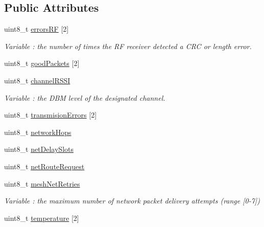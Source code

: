 \subsection*{Public Attributes}
\begin{DoxyCompactItemize}
\item 
uint8\+\_\+t \hyperlink{class_wasp_x_bee900_afb2d912f453a295b9c049b29cd319001}{errors\+RF} \mbox{[}2\mbox{]}\hypertarget{class_wasp_x_bee900_afb2d912f453a295b9c049b29cd319001}{}\label{class_wasp_x_bee900_afb2d912f453a295b9c049b29cd319001}

\begin{DoxyCompactList}\small\item\em Variable \+: the number of times the RF receiver detected a C\+RC or length error. \end{DoxyCompactList}\item 
uint8\+\_\+t \hyperlink{class_wasp_x_bee900_a843814bd98074108a8107088bbcdf231}{good\+Packets} \mbox{[}2\mbox{]}
\item 
uint8\+\_\+t \hyperlink{class_wasp_x_bee900_a38da243d21150ecfec318d85cc4cdd2b}{channel\+R\+S\+SI}\hypertarget{class_wasp_x_bee900_a38da243d21150ecfec318d85cc4cdd2b}{}\label{class_wasp_x_bee900_a38da243d21150ecfec318d85cc4cdd2b}

\begin{DoxyCompactList}\small\item\em Variable \+: the D\+BM level of the designated channel. \end{DoxyCompactList}\item 
uint8\+\_\+t \hyperlink{class_wasp_x_bee900_a5cc97a8a578c273096972e65229012ec}{transmision\+Errors} \mbox{[}2\mbox{]}
\item 
uint8\+\_\+t \hyperlink{class_wasp_x_bee900_a2a1dec450eceab60aab8c44615566e2f}{network\+Hops}
\item 
uint8\+\_\+t \hyperlink{class_wasp_x_bee900_a73e497e2c59c7b74098c6782987de83e}{net\+Delay\+Slots}
\item 
uint8\+\_\+t \hyperlink{class_wasp_x_bee900_ae97fac397c1dde27d55c59d4320c79e9}{net\+Route\+Request}
\item 
uint8\+\_\+t \hyperlink{class_wasp_x_bee900_a0cea54572e6c87e099b06e9ef69ce565}{mesh\+Net\+Retries}\hypertarget{class_wasp_x_bee900_a0cea54572e6c87e099b06e9ef69ce565}{}\label{class_wasp_x_bee900_a0cea54572e6c87e099b06e9ef69ce565}

\begin{DoxyCompactList}\small\item\em Variable \+: the maximum number of network packet delivery attempts (range \mbox{[}0-\/7\mbox{]}) \end{DoxyCompactList}\item 
uint8\+\_\+t \hyperlink{class_wasp_x_bee900_ac3bcf0a86cd953756ec86b8f86895e1d}{temperature} \mbox{[}2\mbox{]}\hypertarget{class_wasp_x_bee900_ac3bcf0a86cd953756ec86b8f86895e1d}{}\label{class_wasp_x_bee900_ac3bcf0a86cd953756ec86b8f86895e1d}


\end{DoxyCompactItemize}
